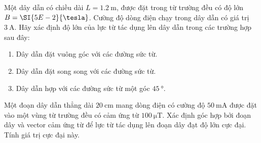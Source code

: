 \begin{ex}
	Một dây dẫn có chiều dài $L=\SI{1.2}{\meter}$, được đặt trong từ trường đều có độ lớn $B=\SI{5E-2}{\tesla}$. Cường độ dòng điện chạy trong dây dẫn có giá trị $\SI{3}{\ampere}$. Hãy xác định độ lớn của lực từ tác dụng lên dây dẫn trong các trường hợp sau đây:
	\begin{enumerate}[label=\alph*)]
		\item Dây dẫn đặt vuông góc với các đường sức từ.
		\item Dây dẫn đặt song song với các đường sức từ.
		\item Dây dẫn hợp với các đường sức từ một góc $\SI{45}{\degree}$.
	\end{enumerate}	
\end{ex}
\begin{ex}
	Một đoạn dây dẫn thẳng dài $\SI{20}{\centi\meter}$ mang dòng điện có cường độ $\SI{50}{\milli\ampere}$ được đặt vào một vùng từ trường đều có cảm ứng từ $\SI{100}{\micro\tesla}$. Xác định góc hợp bởi đoạn dây và vector cảm ứng từ để lực từ tác dụng lên đoạn dây đạt độ lớn cực đại. Tính giá trị cực đại này.	
\end{ex}

